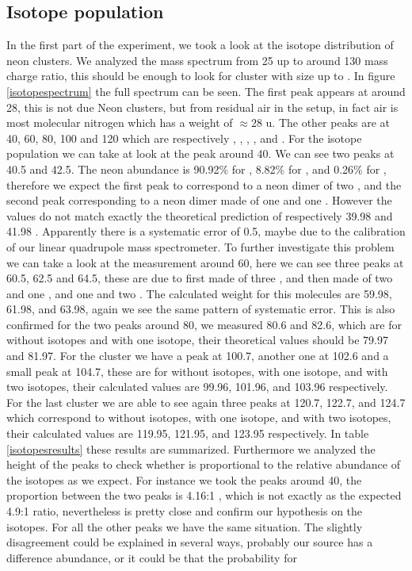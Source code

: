\documentclass[a4paper,10pt]{article}
\begin{document}
\subsection{Isotope population}
In the first part of the experiment, we took a look at the isotope distribution of neon clusters. We analyzed the mass spectrum from 25 up to around 130 mass charge ratio, this should be enough to look for cluster with size up to . In figure \ref{isotopespectrum} the full spectrum can be seen. The first peak appears at around 28, this is not due Neon clusters, but from residual air in the setup, in fact air is most molecular nitrogen  which has a weight of $\approx 28$ u. The other peaks are at 40, 60, 80, 100 and 120 which are respectively , , , , and . For the isotope population we can take at look at the peak around 40. We can see two peaks at 40.5 and 42.5. The neon abundance is 90.92\% for , 8.82\% for , and 0.26\% for  \cite{script}, therefore we expect the first peak to correspond to a neon dimer of two , and the second peak corresponding to a neon dimer made of one  and one . However the values do not match exactly the theoretical prediction of respectively 39.98 and 41.98 \cite{umc}. Apparently there is a systematic error of 0.5, maybe due to the calibration of our linear quadrupole mass spectrometer. To further investigate this problem we can take a look at the measurement around 60, here we can see three peaks at 60.5, 62.5 and 64.5, these are due to  first made of three , and then made of two  and one , and one  and two . The calculated weight for this molecules are 59.98, 61.98, and 63.98, again we see the same pattern of systematic error. This is also confirmed for the two peaks around 80, we measured 80.6 and 82.6, which are for  without isotopes and  with one  isotope, their theoretical values should be 79.97 and 81.97. For the cluster  we have a peak at 100.7, another one at 102.6 and a small peak at 104.7, these are for  without isotopes,  with one  isotope, and  with two  isotopes, their calculated values are 99.96, 101.96, and 103.96 respectively. For the last cluster  we are able to see again three peaks at 120.7, 122.7, and 124.7 which correspond to  without isotopes,  with one  isotope, and  with two  isotopes, their calculated values are 119.95, 121.95, and 123.95 respectively. In table \ref{isotopesresults} these results are summarized.  Furthermore we analyzed the height of the peaks to check whether is proportional to the relative abundance of the isotopes as we expect. For instance we took the peaks around 40, the proportion between the two peaks is 4.16:1 , which is not exactly as the expected 4.9:1 ratio, nevertheless is pretty close and confirm our hypothesis on the isotopes. For all the other peaks we have the same situation. The slightly disagreement could be explained in several ways, probably our source has a difference abundance, or it could be that the probability for 
\end{document}
